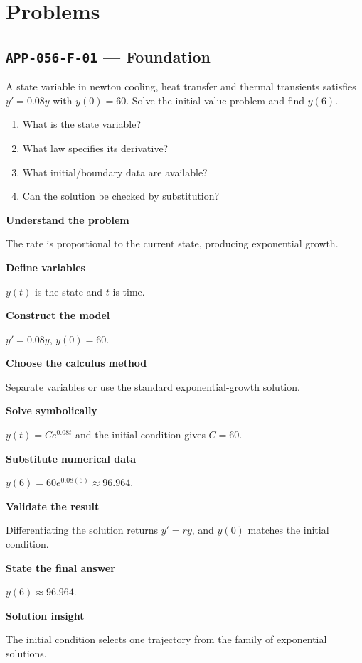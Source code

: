 \documentclass[11pt]{book}
\newcommand{\pid}[1]{\texttt{#1}}
\begin{document}
\section*{Problems}
\subsection*{\pid{APP-056-F-01} — Foundation}
\begin{problembox}
A state variable in newton cooling, heat transfer and thermal transients satisfies $y'=0.08y$ with $y(0)=60$. Solve the initial-value problem and find $y(6)$.
\end{problembox}
\begin{promptbox}\begin{enumerate}
\item What is the state variable?
\item What law specifies its derivative?
\item What initial/boundary data are available?
\item Can the solution be checked by substitution?
\end{enumerate}\end{promptbox}
\begin{solutionbox}
\textbf{Understand the problem}\par The rate is proportional to the current state, producing exponential growth.\par\medskip
\textbf{Define variables}\par $y(t)$ is the state and $t$ is time.\par\medskip
\textbf{Construct the model}\par $y'=0.08y$, $y(0)=60$.\par\medskip
\textbf{Choose the calculus method}\par Separate variables or use the standard exponential-growth solution.\par\medskip
\textbf{Solve symbolically}\par $y(t)=Ce^{0.08t}$ and the initial condition gives $C=60$.\par\medskip
\textbf{Substitute numerical data}\par $y(6)=60e^{0.08(6)}\approx 96.964$.\par\medskip
\textbf{Validate the result}\par Differentiating the solution returns $y'=ry$, and $y(0)$ matches the initial condition.\par\medskip
\textbf{State the final answer}\par $y(6)\approx 96.964$.\par\medskip
\textbf{Solution insight}\par The initial condition selects one trajectory from the family of exponential solutions.\par\medskip
\end{solutionbox}
\end{document}
